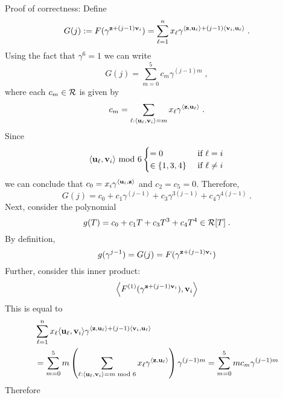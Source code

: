 Proof of correctness:
Define \[G(j):=F(\gamma^{\mathbf{z}+(j-1)\mathbf{v}_{i}})=\sum_{\ell=1}^nx_\ell\gamma^{\langle\mathbf{z},\mathbf{u}_\ell\rangle+(j-1)\langle\mathbf{v}_i,\mathbf{u}_\ell\rangle}\;.\]
Using the fact that $\gamma^6=1$ we can write 
\[
G(j)=\sum_{m=0}^5c_m\gamma^{(j-1)m}\;,
\]
where each $c_m\in \mathcal{R}$ is given by 
\[c_m=\sum_{\ell:\langle\mathbf{u}_\ell,\mathbf{v}_i\rangle=m}x_\ell\gamma^{\langle\mathbf{z},\mathbf{u}_\ell\rangle}\;.\]
Since 
\[
\langle \mathbf{u}_\ell,\mathbf{v}_i\rangle\text{ mod }6\begin{cases}
    =0 &\text{ if }\ell=i\\
    \in \{1,3,4\}&\text{ if }\ell\ne i
\end{cases}
\]
we can conclude that $c_0=x_i\gamma^{\langle \mathbf{u}_i,\mathbf{z}\rangle}$ and $c_2=c_5=0$. Therefore,
\[
G(j)=c_0+c_1\gamma^{(j-1)}+c_3\gamma^{3(j-1)}+c_4\gamma^{4(j-1)}\;.
\]
Next, consider the polynomial
\[g(T)=c_0+c_1T+c_3T^3+c_4T^4\in \mathcal{R}[T]\;.\]
By definition, 
\[g(\gamma^{j-1})=G(j)=F(\gamma^{\mathbf{z}+(j-1)\mathbf{v}_i})\]
Further, consider this inner product:
\[
\left\langle
F^{(1)}(\gamma^{\mathbf{z}+(j-1)\mathbf{v}_i}), \mathbf{v}_i
\right\rangle
\]
This is equal to
\begin{align*}
    &\sum_{\ell=1}^nx_\ell\langle\mathbf{u}_\ell,\mathbf{v}_i\rangle\gamma^{\langle\mathbf{z},\mathbf{u}_\ell\rangle+(j-1)\langle\mathbf{v}_i,\mathbf{u}_\ell\rangle}\\
    &=\sum_{m=0}^5m\left(\sum_{\ell:\langle \mathbf{u}_\ell,\mathbf{v}_i\rangle=m\text{ mod } 6}x_\ell\gamma^{\langle \mathbf{z},\mathbf{u}_\ell \rangle}\right)\gamma^{(j-1)m}=\sum_{m=0}^5m c_m \gamma^{(j-1)m}
\end{align*}
Therefore
